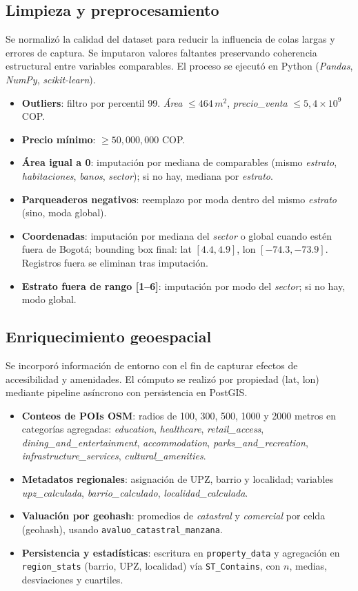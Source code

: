 \subsection*{Limpieza y preprocesamiento}
Se normalizó la calidad del dataset para reducir la influencia de colas largas y errores de captura. Se imputaron valores faltantes preservando coherencia estructural entre variables comparables. El proceso se ejecutó en Python (\textit{Pandas}, \textit{NumPy}, \textit{scikit-learn}).
\begin{itemize}
    \item \textbf{Outliers}: filtro por percentil 99. \emph{Área} \(\leq 464\,m^2\), \emph{precio\_venta} \(\leq 5{,}4\times 10^9\) COP.
    \item \textbf{Precio mínimo}: \(\geq 50{,}000{,}000\) COP.
    \item \textbf{Área igual a 0}: imputación por mediana de comparables (mismo \emph{estrato}, \emph{habitaciones}, \emph{banos}, \emph{sector}); si no hay, mediana por \emph{estrato}.
    \item \textbf{Parqueaderos negativos}: reemplazo por moda dentro del mismo \emph{estrato} (sino, moda global).
    \item \textbf{Coordenadas}: imputación por mediana del \emph{sector} o global cuando estén fuera de Bogotá; bounding box final: lat \([4.4, 4.9]\), lon \([-74.3, -73.9]\). Registros fuera se eliminan tras imputación.
    \item \textbf{Estrato fuera de rango [1--6]}: imputación por modo del \emph{sector}; si no hay, modo global.
\end{itemize}

\subsection*{Enriquecimiento geoespacial}
Se incorporó información de entorno con el fin de capturar efectos de accesibilidad y amenidades. El cómputo se realizó por propiedad (lat, lon) mediante pipeline asíncrono con persistencia en PostGIS.
\begin{itemize}
    \item \textbf{Conteos de POIs OSM}: radios de 100, 300, 500, 1000 y 2000 metros en categorías agregadas: \emph{education}, \emph{healthcare}, \emph{retail\_access}, \emph{dining\_and\_entertainment}, \emph{accommodation}, \emph{parks\_and\_recreation}, \emph{infrastructure\_services}, \emph{cultural\_amenities}.
    \item \textbf{Metadatos regionales}: asignación de UPZ, barrio y localidad; variables \emph{upz\_calculada}, \emph{barrio\_calculado}, \emph{localidad\_calculada}.
    \item \textbf{Valuación por geohash}: promedios de \emph{catastral} y \emph{comercial} por celda (geohash), usando \texttt{avaluo\_catastral\_manzana}.
    \item \textbf{Persistencia y estadísticas}: escritura en \texttt{property\_data} y agregación en \texttt{region\_stats} (barrio, UPZ, localidad) vía \texttt{ST\_Contains}, con \(n\), medias, desviaciones y cuartiles.
\end{itemize}

